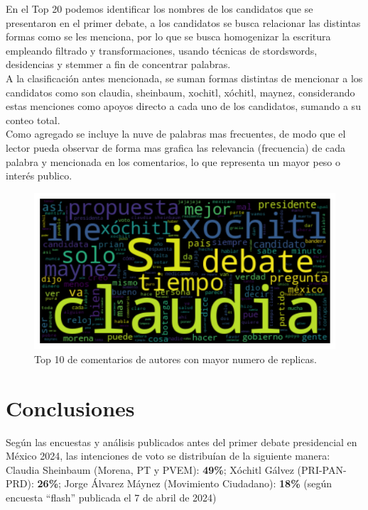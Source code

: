 En el Top 20 podemos identificar los nombres de los candidatos que se presentaron en el primer debate, a los candidatos se busca relacionar las distintas formas como se les menciona, por lo que se busca homogenizar la escritura empleando filtrado y transformaciones, usando técnicas de stordswords, desidencias y stemmer a fin de concentrar palabras.\\

A la clasificación antes mencionada, se suman formas distintas de mencionar a los candidatos como son claudia, sheinbaum, xochitl, xóchitl, maynez, considerando estas menciones como apoyos directo a cada uno de los candidatos, sumando a su conteo total.\\

Como agregado se incluye la nuve de palabras mas frecuentes, de modo que el lector pueda observar de forma mas grafica las relevancia (frecuencia) de cada palabra y mencionada en los comentarios, lo que representa un mayor peso o interés publico.\\

\begin{figure}[!h]
	\centering
	\includegraphics[width=16cm]{../Datos/NuveDePalabras}
	\caption{Top 10 de comentarios de autores con mayor numero de replicas.}
	\label{fig:NDP}
\end{figure}


\chapter{Conclusiones}

Según las encuestas y análisis publicados antes del primer debate presidencial en México 2024, las intenciones de voto se distribuían de la siguiente manera:\\

Claudia Sheinbaum (Morena, PT y PVEM): \textbf{49\%}; Xóchitl Gálvez (PRI-PAN-PRD): \textbf{26\%}; Jorge Álvarez Máynez (Movimiento Ciudadano): \textbf{18\%} (según encuesta “flash” publicada el 7 de abril de 2024)\\

